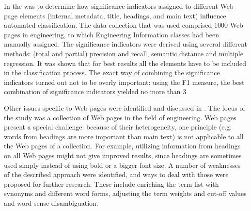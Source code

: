 In \cite{ardo05:_ECDL} the was to determine how significance indicators assigned to different Web page elements (internal metadata, title, headings, and main text) influence automated classification. The data collection that was used comprised 1000 Web pages in engineering, to which Engineering Information classes had been manually assigned. The significance indicators were derived using several different methods: (total and partial) precision and recall, semantic distance and multiple regression. It was shown that for best results all the elements have to be included in the classification process. The exact way of combining the significance indicators turned out not to be overly important: using the F1 measure, the best combination of significance indicators yielded no more than 3%

Other issues specific to Web pages were identified and discussed in \cite{GolubChall}. The focus of the study was a collection of Web pages in the field of engineering. Web pages present a special challenge: because of their heterogeneity, one principle (e.g. words from headings are more important than main text) is not applicable to all the Web pages of a collection. For example, utilizing information from headings on all Web pages might not give improved results, since headings are sometimes used simply instead of using bold or a bigger font size. A number of weaknesses of the described approach were identified, and ways to deal with those were proposed for further research. These include enriching the term list with synonyms and different word forms, adjusting the term weights and cut-off values and word-sense disambiguation.
